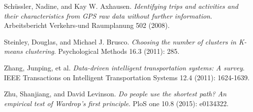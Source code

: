 \documentclass[twoside,leqno,twocolumn]{article}
\begin{document}
\begin{thebibliography}{99}
Schüssler, Nadine, and Kay W. Axhausen. {\em Identifying trips and activities and their characteristics from GPS raw data without further information}. Arbeitsbericht Verkehrs-und Raumplanung 502 (2008).

Steinley, Douglas, and Michael J. Brusco. {\em Choosing the number of clusters in Κ-means clustering}. Psychological Methods 16.3 (2011): 285.

Zhang, Junping, et al. {\em Data-driven intelligent transportation systems: A survey}. IEEE Transactions on Intelligent Transportation Systems 12.4 (2011): 1624-1639.

Zhu, Shanjiang, and David Levinson. {\em Do people use the shortest path? An empirical test of Wardrop’s first principle}. PloS one 10.8 (2015): e0134322.

%

\end{thebibliography}
\end{document}
